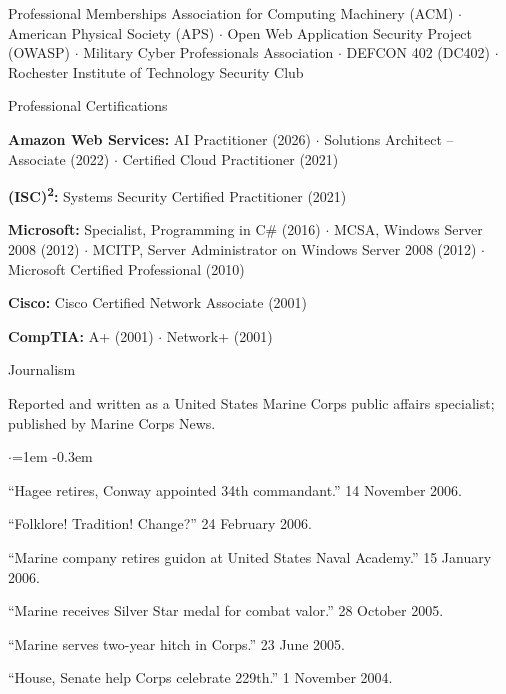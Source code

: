 \documentclass{resume}
\newcommand{\certgroup}[2]{%
  {\bf #1:} #2\par\vspace{0.25em}
}
\begin{document}

\begin{rSection}{Professional Memberships}
Association for Computing Machinery (ACM) $\cdot$ American Physical Society (APS) $\cdot$
Open Web Application Security Project (OWASP) $\cdot$ Military Cyber Professionals Association $\cdot$
DEFCON 402 (DC402) $\cdot$ Rochester Institute of Technology Security Club
\end{rSection}


\begin{rSection}{Professional Certifications}

\certgroup{Amazon Web Services}{AI Practitioner (2026) $\cdot$ Solutions Architect -- Associate (2022) $\cdot$ Certified Cloud Practitioner (2021)}

\certgroup{(ISC)\textsuperscript{2}}{Systems Security Certified Practitioner (2021)}

\certgroup{Microsoft}{Specialist, Programming in C\# (2016) $\cdot$ MCSA, Windows Server 2008 (2012) $\cdot$
MCITP, Server Administrator on Windows Server 2008 (2012) $\cdot$ Microsoft Certified Professional (2010)}

\certgroup{Cisco}{Cisco Certified Network Associate (2001)}

\certgroup{CompTIA}{A+ (2001) $\cdot$ Network+ (2001)}

\end{rSection}


\begin{rSection}{Journalism}

Reported and written as a United States Marine Corps public affairs specialist; published by
Marine Corps News.

\begin{list}{$\cdot$}{\leftmargin=1em \itemsep -0.3em}
\item ``Hagee retires, Conway appointed 34th commandant.'' 14 November 2006.
\item ``Folklore! Tradition! Change?'' 24 February 2006.
\item ``Marine company retires guidon at United States Naval Academy.'' 15 January 2006.
\item ``Marine receives Silver Star medal for combat valor.'' 28 October 2005.
\item ``Marine serves two-year hitch in Corps.'' 23 June 2005.
\item ``House, Senate help Corps celebrate 229th.'' 1 November 2004.
\end{list}

\end{rSection}
\end{document}
